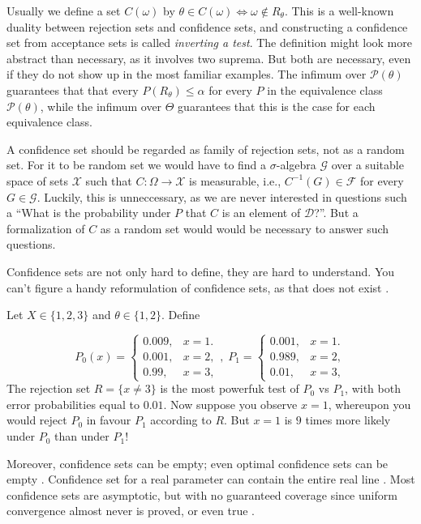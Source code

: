 Usually we define a set $C(\omega)$ by $\theta\in C(\omega)\iff\omega\notin R_{\theta}$.
This is a well-known duality between rejection sets and confidence
sets, and constructing a confidence set from acceptance sets is called
\emph{inverting a test}. The definition might look more abstract than
necessary, as it involves two suprema. But both are necessary, even
if they do not show up in the most familiar examples. The infimum
over $\mathcal{P}(\theta)$ guarantees that that every $P(R_{\theta})\leq\alpha$
for every $P$ in the equivalence class $\mathcal{P}(\theta)$, while
the infimum over $\Theta$ guarantees that this is the case for each
equivalence class.

A confidence set should be regarded as family of rejection sets, not
as a random set. For it to be random set we would have to find a $\sigma$-algebra
$\mathcal{G}$ over a suitable space of sets $\mathcal{X}$ such that
$C:\Omega\to\mathcal{X}$ is measurable, i.e., $C^{-1}(G)\in\mathcal{F}$
for every $G\in\mathcal{G}$. Luckily, this is unneccessary, as we
are never interested in questions such a ``What is the probability
under $P$ that $C$ is an element of $\mathcal{D}$?''. But a formalization
of $C$ as a random set would would be necessary to answer such questions.

Confidence sets are not only hard to define, they are hard to understand.
You can't figure a handy reformulation of confidence sets, as that
does not exist \parencite{Morey2016-ry}. 
\begin{example}
 Let $X\in\{1,2,3\}$ and $\theta\in\{1,2\}$. Define

\[
P_{0}(x)=\begin{cases}
0.009, & x=1.\\
0.001, & x=2,\\
0.99, & x=3,
\end{cases},\;P_{1}=\begin{cases}
0.001, & x=1.\\
0.989, & x=2,\\
0.01, & x=3,
\end{cases}
\]
The rejection set $R=\{x\neq3\}$ is the most powerfuk test of $P_{0}$
vs $P_{1}$, with both error probabilities equal to $0.01$. Now suppose
you observe $x=1$, whereupon you would reject $P_{0}$ in favour
$P_{1}$ according to $R$. But $x=1$ is $9$ times more likely under
$P_{0}$ than under $P_{1}$!
\end{example}

Moreover, confidence sets can be empty; even optimal confidence sets
can be empty \parencite{Blaker2000-ud}. Confidence set for a real parameter
can contain the entire real line \parencite{Morey2016-ry}. Most confidence
sets are asymptotic, but with no guaranteed coverage since uniform
convergence almost never is proved, or even true \parencite{Gleser1996-kk}.

